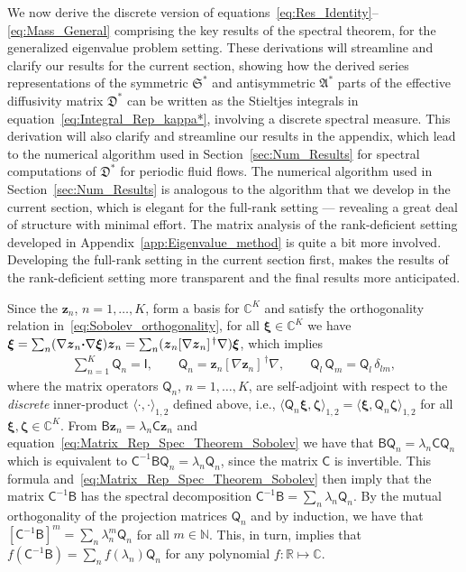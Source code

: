 \documentclass[english,12pt,jmp,graphicx]{revtex4-1}
\newcommand{\vecxi}{\boldsymbol{\xi}}
\newcommand{\veczeta}{\boldsymbol{\zeta}}
\newcommand{\vecz}{\boldsymbol{z}}
\newcommand{\secref}[1]{Section~\ref{#1}}
\newcommand{\appref}[1]{Appendix~\ref{#1}}
\newcommand{\bcdot}{\mbox{\boldmath${\cdot}$}}
\newcommand{\Sg}{\mathfrak{S}}
\newcommand{\Ag}{\mathfrak{A}}
\newcommand{\Dg}{\mathfrak{D}}
\newcommand{\Bm}{\mathsf{B}}
\newcommand{\Cm}{\mathsf{C}}
\newcommand{\Qm}{\mathsf{Q}}
\newcommand{\Ib}{\mathsf{I}}
\begin{document}
We now derive the discrete version of
equations~\eqref{eq:Res_Identity}--\eqref{eq:Mass_General} comprising
the key results of the spectral theorem, for the generalized
eigenvalue problem setting. These derivations will  
streamline and clarify our results for the current section, showing how the
derived series representations of the symmetric $\Sg^*$ and
antisymmetric $\Ag^*$ parts of the effective diffusivity matrix
$\Dg^*$ can be written as the Stieltjes integrals in
equation~\eqref{eq:Integral_Rep_kappa*}, involving a discrete spectral
measure. This derivation will also 
clarify and streamline our results in the appendix, which lead to the
numerical algorithm used in \secref{sec:Num_Results} for spectral
computations of $\Dg^*$ for  periodic fluid flows. The numerical
algorithm used in \secref{sec:Num_Results} is analogous to the
algorithm that we develop in the current section, which is elegant for 
the full-rank setting --- revealing a great deal of structure with
minimal effort. The matrix analysis of the rank-deficient setting
developed in \appref{app:Eigenvalue_method} is quite a bit more
involved. Developing the full-rank setting in the current section
first, makes the results of the rank-deficient setting more transparent
and the final results more anticipated.  





Since the $\vecz_n$, $n=1,\ldots,K$, form a basis for $\mathbb{C}^K$ and
satisfy the orthogonality relation
in~\eqref{eq:Sobolev_orthogonality}, for all 
$\vecxi\in\mathbb{C}^K$ we have 
$\vecxi=\sum_n(\nabla\vecz_n\bcdot\nabla\vecxi)\vecz_n
=\sum_n(\vecz_n[\nabla\vecz_n]^{\,\dagger}\nabla)\vecxi$, which
implies
%
\begin{align}\label{eq:Matrix_Rep_Spec_Theorem_Sobolev}
  \sum_{n=1}^K\Qm_n=\Ib, \qquad
  \Qm_n=\vecz_n[\nabla\vecz_n]^{\,\dagger}\nabla,  \qquad
  \Qm_l\,\Qm_m=\Qm_l\,\delta_{l m},
\end{align}
%
where the matrix operators $\Qm_n$, $n=1,\ldots,K$, are self-adjoint with
respect to the \emph{discrete} inner-product
$\langle\cdot,\cdot\rangle_{1,2}$ defined above, i.e.,
$\langle\Qm_n\vecxi,\veczeta\rangle_{1,2}=\langle\vecxi,\Qm_n\veczeta\rangle_{1,2}$
for all $\vecxi,\veczeta\in\mathbb{C}^K$. 
From $\Bm\vecz_n=\lambda_n\Cm\vecz_n$ and
equation~\eqref{eq:Matrix_Rep_Spec_Theorem_Sobolev} we have that
$\Bm\Qm_n=\lambda_n\Cm\Qm_n$ which is equivalent to
$\Cm^{-1}\Bm\Qm_n=\lambda_n\Qm_n$, since the matrix $\Cm$ is
invertible. This formula
and~\eqref{eq:Matrix_Rep_Spec_Theorem_Sobolev} then imply that the matrix 
$\Cm^{-1}\Bm$ has the spectral decomposition
$\Cm^{-1}\Bm=\sum_n\lambda_n\Qm_n$. By the mutual 
orthogonality of the projection matrices $\Qm_n$ and by induction, we
have that  
$[\Cm^{-1}\Bm]^m=\sum_n\lambda_n^m\Qm_n$ for all $m\in\mathbb{N}$. This, in turn,
implies that $f(\Cm^{-1}\Bm)=\sum_nf(\lambda_n)\Qm_n$ for
any polynomial $f:\mathbb{R}\mapsto\mathbb{C}$.
\end{document}
